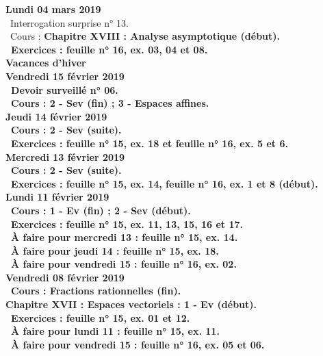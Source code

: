 \documentclass[12pt,a4paper]{article}
\begin{document}
\noindent\textbf{\bf Lundi 04 mars 2019} \\
\bu\ Interrogation surprise n° 13.\\
\bu\ Cours : \bf Chapitre XVIII \rm : Analyse asymptotique 
(début).\\
\bu\ Exercices : feuille n° 16, ex. 03, 04 et 08.\vspace{.4cm}\\

\noindent\textbf{\bf Vacances d'hiver }\\

\noindent\textbf{Vendredi 15 février 2019}\\
\bu\ Devoir surveillé n° 06.\\
\bu\ Cours : 2 - Sev (fin) ; 3 - Espaces affines.\vspace{.4cm}\\
 
\noindent\textbf{Jeudi 14 février 2019}\\
\bu\ Cours : 2 - Sev (suite).\\
\bu\ Exercices : feuille n° 15, ex. 18 et feuille n° 16, ex. 5 et 6.\vspace{.4cm}\\
 
\noindent\textbf{Mercredi 13 février 2019} \\
\bu\ Cours : 2 - Sev (suite).\\
\bu\ Exercices : feuille n° 15, ex. 14, feuille n° 16, ex. 1 et 8 (début).\vspace{.4cm}\\

\noindent\textbf{\bf Lundi 11 février 2019} \\
\bu\ Cours : 1 - Ev (fin) ; 2 - Sev (début).\\
\bu\ Exercices : feuille n° 15, ex. 11, 13, 15, 16 et 17.\\
\bu\ À faire pour mercredi 13 : feuille n° 15, ex. 14.\\
\bu\ À faire pour jeudi 14 : feuille n° 15, ex. 18.\\
\bu\ À faire pour vendredi 15 : feuille n° 16, ex. 02.\vspace{.4cm}\\

\noindent\textbf{Vendredi 08 février 2019}\\
\bu\ Cours : Fractions rationnelles (fin).\\
\bf Chapitre XVII \rm : Espaces vectoriels : 1 - Ev (début).\\
\bu\ Exercices : feuille n° 15, ex. 01 et 12.\\
\bu\ À faire pour lundi 11 : feuille n° 15, ex. 11.\\
\bu\ À faire pour vendredi 15 : feuille n° 16, ex. 05 et 06.\vspace{.4cm}\\
 
\end{document}
